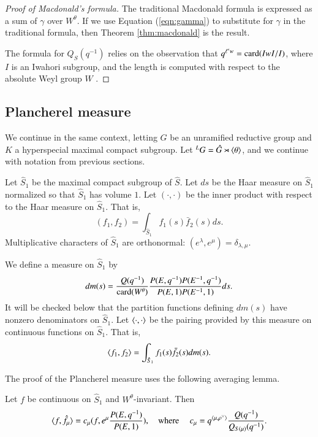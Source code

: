\begin{proof}[Proof of Macdonald's formula]
The traditional Macdonald formula is expressed as a sum of $\gamma$
over $W^\theta$.  If we use Equation (\ref{eqn:gamma}) to substitute
for $\gamma$ in the traditional formula, then Theorem
\ref{thm:macdonald} is the result.

The formula for $Q_S(q^{-1})$ relies on the observation that $q^{\ell'
  w} = {\operatorname{card}}(IwI/I)$, where $I$ is an Iwahori subgroup, and the
length is computed with respect to the absolute Weyl group $W$
\cite[p.74]{carter1985finite}.
\end{proof}


\subsection{Plancherel measure}
We continue in the same context, letting $G$ be an unramified
reductive group and $K$ a hyperspecial maximal compact subgroup.  Let
${}^LG = \hat G\rtimes \langle{\theta}\rangle$, and we continue with notation
from previous sections.

Let ${\hat S}_1$ be the maximal compact subgroup of $\hat S$.  Let $ds$
be the Haar measure on $\hat S_1$ normalized so that $\hat S_1$ has
volume $1$.  Let $(\cdot,\cdot)$ be the inner product with respect to
the Haar measure on $\hat S_1$. That is,
\begin{equation}
(f_1,f_2) = \int_{\hat S_1} f_1(s) \bar f_2(s) ds.
\end{equation}
Multiplicative characters of $\hat S_1$ are orthonormal:
$(e^\lambda,e^\mu) = \delta_{\lambda,\mu}$.

We define a measure on $\hat S_1$ by
\begin{equation}
dm(s) = \frac{Q(q^{-1})}{{\operatorname{card}}(W^\theta)}
\frac{P(E,q^{-1}) P(E^{-1},q^{-1})}{P(E,1) P(E^{-1},1)} ds.
\end{equation}
It will be checked below that the partition functions defining $dm(s)$
have nonzero denominators on $\hat S_1$.  Let $\langle{\cdot,\cdot}\rangle$ be
the pairing provided by this measure on continuous functions on $\hat
S_1$.  That is,
\begin{equation}
\langle{f_1,f_2}\rangle = \int_{\hat S_1} f_1(s) \bar f_2(s) dm(s).
\end{equation}

The proof of the Plancherel measure uses the following averaging lemma.

\begin{lemma}\label{lemma:average} 
  Let $f$ be continuous on $\hat S_1$ and $W^\theta$-invariant.  Then
\[
\langle{f,\hat f_\mu}\rangle = c_\mu  (f, e^\mu\frac{ P(E,q^{-1})}{P(E,1)}),
\quad\text{where }\quad
c_\mu = q^{\langle{\mu,\rho^\vee}\rangle}\frac{ Q(q^{-1})}{Q_{S(\mu)}(q^{-1})}.
\]
\end{lemma}

